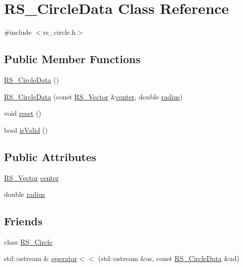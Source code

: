 \hypertarget{class_r_s___circle_data}{\section{R\-S\-\_\-\-Circle\-Data Class Reference}
\label{class_r_s___circle_data}
}


{\ttfamily \#include $<$rs\-\_\-circle.\-h$>$}

\subsection*{Public Member Functions}
\begin{DoxyCompactItemize}
\item 
\hyperlink{class_r_s___circle_data_a7737053b9767a78c5c8ac5de7f2c0c23}{R\-S\-\_\-\-Circle\-Data} ()
\item 
\hyperlink{class_r_s___circle_data_aa4f1a8fc33b0f469011d74c620a47f38}{R\-S\-\_\-\-Circle\-Data} (const \hyperlink{class_r_s___vector}{R\-S\-\_\-\-Vector} \&\hyperlink{class_r_s___circle_data_ad2b663f9f37c36eb776a9c4368d29d06}{center}, double \hyperlink{class_r_s___circle_data_ac13bff7aa8e71eb06eec208cf6d302d1}{radius})
\item 
void \hyperlink{class_r_s___circle_data_ae2983a0e46c0f0dcd02e33031f40d6cd}{reset} ()
\item 
bool \hyperlink{class_r_s___circle_data_aea169bd6ee564bc13b6f68e997b7e74c}{is\-Valid} ()
\end{DoxyCompactItemize}
\subsection*{Public Attributes}
\begin{DoxyCompactItemize}
\item 
\hyperlink{class_r_s___vector}{R\-S\-\_\-\-Vector} \hyperlink{class_r_s___circle_data_ad2b663f9f37c36eb776a9c4368d29d06}{center}
\item 
double \hyperlink{class_r_s___circle_data_ac13bff7aa8e71eb06eec208cf6d302d1}{radius}
\end{DoxyCompactItemize}
\subsection*{Friends}
\begin{DoxyCompactItemize}
\item 
class \hyperlink{class_r_s___circle_data_a1e56fbcafce84435520d03b813482495}{R\-S\-\_\-\-Circle}
\item 
std\-::ostream \& \hyperlink{class_r_s___circle_data_a4e52d2819694c3d3e244f9fd5eccf74d}{operator$<$$<$} (std\-::ostream \&os, const \hyperlink{class_r_s___circle_data}{R\-S\-\_\-\-Circle\-Data} \&ad)
\end{DoxyCompactItemize}


